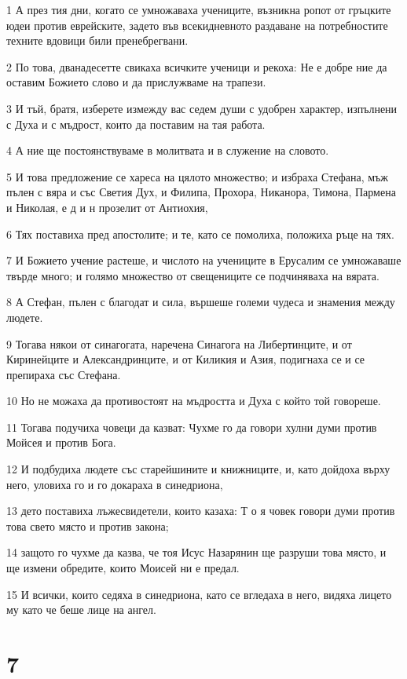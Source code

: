\par 1 А през тия дни, когато се умножаваха учениците, възникна ропот от гръцките юдеи против еврейските, задето във всекидневното раздаване на потребностите техните вдовици били пренебрегвани.
\par 2 По това, дванадесетте свикаха всичките ученици и рекоха: Не е добре ние да оставим Божието слово и да прислужваме на трапези.
\par 3 И тъй, братя, изберете измежду вас седем души с удобрен характер, изпълнени с Духа и с мъдрост, които да поставим на тая работа.
\par 4 А ние ще постоянствуваме в молитвата и в служение на словото.
\par 5 И това предложение се хареса на цялото множество; и избраха Стефана, мъж пълен с вяра и със Светия Дух, и Филипа, Прохора, Никанора, Тимона, Пармена и Николая, е д и н прозелит от Антиохия,
\par 6 Тях поставиха пред апостолите; и те, като се помолиха, положиха ръце на тях.
\par 7 И Божието учение растеше, и числото на учениците в Ерусалим се умножаваше твърде много; и голямо множество от свещениците се подчиняваха на вярата.
\par 8 А Стефан, пълен с благодат и сила, вършеше големи чудеса и знамения между людете.
\par 9 Тогава някои от синагогата, наречена Синагога на Либертинците, и от Киринейците и Александринците, и от Киликия и Азия, подигнаха се и се препираха със Стефана.
\par 10 Но не можаха да противостоят на мъдростта и Духа с който той говореше.
\par 11 Тогава подучиха човеци да казват: Чухме го да говори хулни думи против Мойсея и против Бога.
\par 12 И подбудиха людете със старейшините и книжниците, и, като дойдоха върху него, уловиха го и го докараха в синедриона,
\par 13 дето поставиха лъжесвидетели, които казаха: Т о я човек говори думи против това свето място и против закона;
\par 14 защото го чухме да казва, че тоя Исус Назарянин ще разруши това място, и ще измени обредите, които Моисей ни е предал.
\par 15 И всички, които седяха в синедриона, като се вгледаха в него, видяха лицето му като че беше лице на ангел.

\chapter{7}

